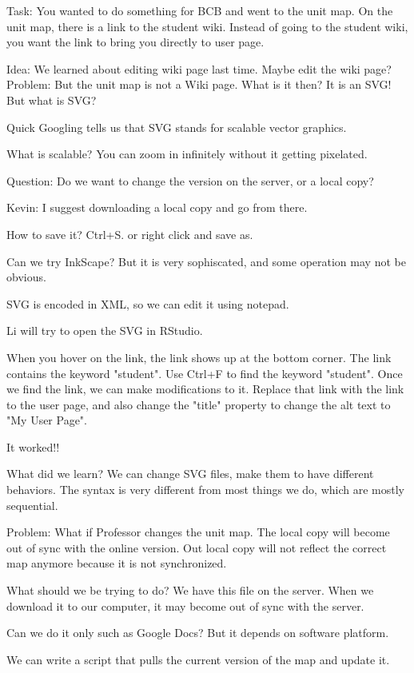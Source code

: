 \documentclass{article}
\begin{document}
Task: You wanted to do something for BCB and went to the unit map. On the unit map, there is a link to the student wiki. Instead of going to the student wiki, you want the link to bring you directly to user page.

Idea: We learned about editing wiki page last time. Maybe edit the wiki page?
Problem: But the unit map is not a Wiki page.
What is it then? It is an SVG! But what is SVG?

Quick Googling tells us that SVG stands for scalable vector graphics.

What is scalable? You can zoom in infinitely without it getting pixelated.

Question: Do we want to change the version on the server, or a local copy?

Kevin: I suggest downloading a local copy and go from there.

How to save it? Ctrl+S. or right click and save as.

Can we try InkScape? But it is very sophiscated, and some operation may not be obvious.

SVG is encoded in XML, so we can edit it using notepad.

Li will try to open the SVG in RStudio.

When you hover on the link, the link shows up at the bottom corner. The link contains the keyword "student". Use Ctrl+F to find the keyword "student". Once we find the link, we can make modifications to it. Replace that link with the link to the user page, and also change the "title" property to change the alt text to "My User Page". 

It worked!!

What did we learn?
We can change SVG files, make them to have different behaviors. The syntax is very different from most things we do, which are mostly sequential.

Problem: What if Professor changes the unit map. The local copy will become out of sync with the online version. Out local copy will not reflect the correct map anymore because it is not synchronized.

What should we be trying to do?
We have this file on the server. When we download it to our computer, it may become out of sync with the server.

Can we do it only such as Google Docs? But it depends on software platform.

We can write a script that pulls the current version of the map and update it.
\end{document}
